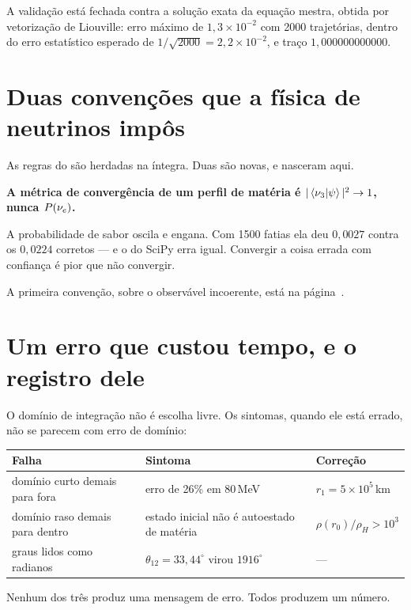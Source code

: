 A validação está fechada contra a solução exata da equação mestra, obtida por
vetorização de Liouville: erro máximo de $1{,}3\times10^{-2}$ com 2000
trajetórias, dentro do erro estatístico esperado de
$1/\sqrt{2000} = 2{,}2\times10^{-2}$, e traço $1{,}000000000000$.

\section{Duas convenções que a física de neutrinos impôs}

As regras do  são herdadas na íntegra. Duas são novas, e
nasceram aqui.

\begin{conceito}
\textbf{A métrica de convergência de um perfil de matéria é
$|\left\langle\nu_3\middle|\psi\right\rangle|^2 \to 1$, nunca $P(\nu_e)$.}

\medskip
A probabilidade de sabor oscila e engana. Com 1500 fatias ela deu $0{,}0027$
contra os $0{,}0224$ corretos --- e o  do SciPy erra igual. Convergir
a coisa errada com confiança é pior que não convergir.
\end{conceito}

A primeira convenção, sobre o observável incoerente, está na página~\pageref{cap:teoria}.

\section{Um erro que custou tempo, e o registro dele}

O domínio de integração não é escolha livre. Os sintomas, quando ele está
errado, não se parecem com erro de domínio:

\begin{center}
\begin{tabular}{@{}>{\sffamily\small}p{3.9cm} >{\small}p{5.0cm} >{\small}p{3.4cm}@{}}
\toprule
\sffamily\bfseries\small Falha & \sffamily\bfseries\small Sintoma & \sffamily\bfseries\small Correção \\
\midrule
domínio curto demais para fora & erro de 26\% em 80\,MeV & $r_1 = 5\times10^{5}$\,km \\
domínio raso demais para dentro & estado inicial não é autoestado de matéria & $\rho(r_0)/\rho_H > 10^{3}$ \\
graus lidos como radianos & $\theta_{12} = 33{,}44^\circ$ virou $1916^\circ$ & --- \\
\bottomrule
\end{tabular}
\end{center}

Nenhum dos três produz uma mensagem de erro. Todos produzem um número.
